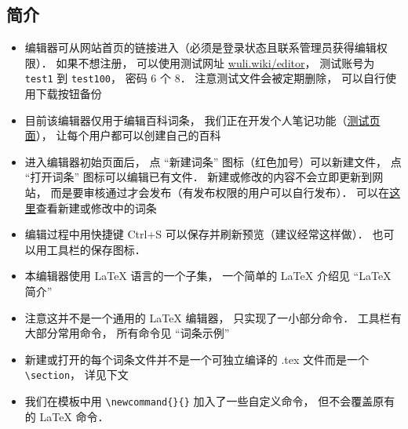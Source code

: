 
\subsection{简介}
\begin{itemize}
\item 编辑器可从网站首页的链接进入（必须是登录状态且联系管理员获得编辑权限）． 如果不想注册， 可以使用测试网址 \href{http://wuli.wiki/editor}{wuli.wiki/editor}， 测试账号为 \lstinline|test1| 到 \lstinline|test100|， 密码 6 个 8． 注意测试文件会被定期删除， 可以自行使用下载按钮备份
\item 目前该编辑器仅用于编辑百科词条， 我们正在开发个人笔记功能（\href{http://wuli.wiki/editor?target=home}{测试页面}）， 让每个用户都可以创建自己的百科
\item 进入编辑器初始页面后， 点 “新建词条” 图标（红色加号）可以新建文件， 点 “打开词条” 图标可以编辑已有文件． 新建或修改的内容不会立即更新到网站， 而是要审核通过才会发布（有发布权限的用户可以自行发布）． 可以在\href{http://wuli.wiki/changed/changed.html}{这里}查看新建或修改中的词条
\item 编辑过程中用快捷键 Ctrl+S 可以保存并刷新预览（建议经常这样做）． 也可以用工具栏的保存图标．
\item 本编辑器使用 LaTeX 语言的一个子集， 一个简单的 LaTeX 介绍见 “LaTeX 简介”
\item 注意这并不是一个通用的 LaTeX 编辑器， 只实现了一小部分命令． 工具栏有大部分常用命令， 所有命令见 “词条示例”
\item 新建或打开的每个词条文件并不是一个可独立编译的 .tex 文件而是一个 \lstinline|\section|， 详见下文
\item 我们在模板中用 \lstinline|\newcommand{}{}| 加入了一些自定义命令， 但不会覆盖原有的 LaTeX 命令．
\end{itemize}

